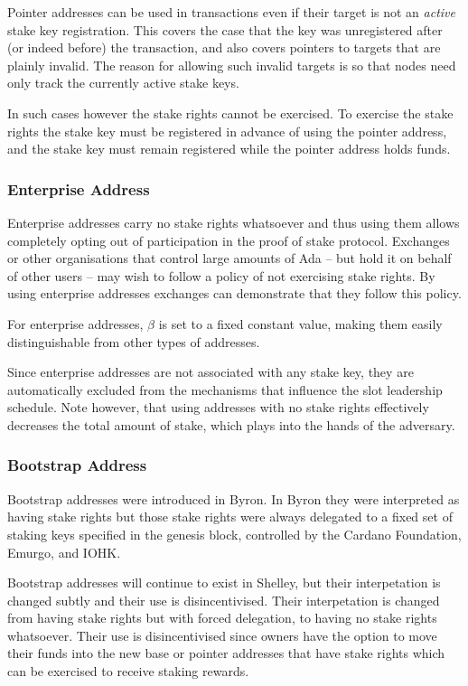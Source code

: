 \documentclass[11pt,a4paper]{article}
\begin{document}
Pointer addresses can be used in transactions even if their target is
not an \emph{active} stake key registration. This covers the case that
the key was unregistered after (or indeed before) the transaction, and
also covers pointers to targets that are plainly invalid. The reason for
allowing such invalid targets is so that nodes need only track the
currently active stake keys.

In such cases however the stake rights cannot be exercised. To exercise
the stake rights the stake key must be registered in advance of using
the pointer address, and the stake key must remain registered while the
pointer address holds funds.

\subsubsection{Enterprise Address}\label{enterprise-address}

Enterprise addresses carry no stake rights whatsoever and thus using
them allows completely opting out of participation in the proof of stake
protocol. Exchanges or other organisations that control large amounts of
Ada -- but hold it on behalf of other users -- may wish to follow a
policy of not exercising stake rights. By using enterprise addresses
exchanges can demonstrate that they follow this policy.

For enterprise addresses, \(\beta\) is set to a fixed constant value,
making them easily distinguishable from other types of addresses.

Since enterprise addresses are not associated with any stake key, they
are automatically excluded from the mechanisms that influence the slot
leadership schedule. Note however, that using addresses with no stake
rights effectively decreases the total amount of stake, which plays into
the hands of the adversary.

\subsubsection{Bootstrap Address}\label{bootstrap-address}

Bootstrap addresses were introduced in Byron. In Byron they were
interpreted as having stake rights but those stake rights were always
delegated to a fixed set of staking keys specified in the genesis block,
controlled by the Cardano Foundation, Emurgo, and IOHK.

Bootstrap addresses will continue to exist in Shelley, but their
interpetation is changed subtly and their use is disincentivised. Their
interpetation is changed from having stake rights but with forced
delegation, to having no stake rights whatsoever. Their use is
disincentivised since owners have the option to move their funds into
the new base or pointer addresses that have stake rights which can be
exercised to receive staking rewards.
\end{document}
